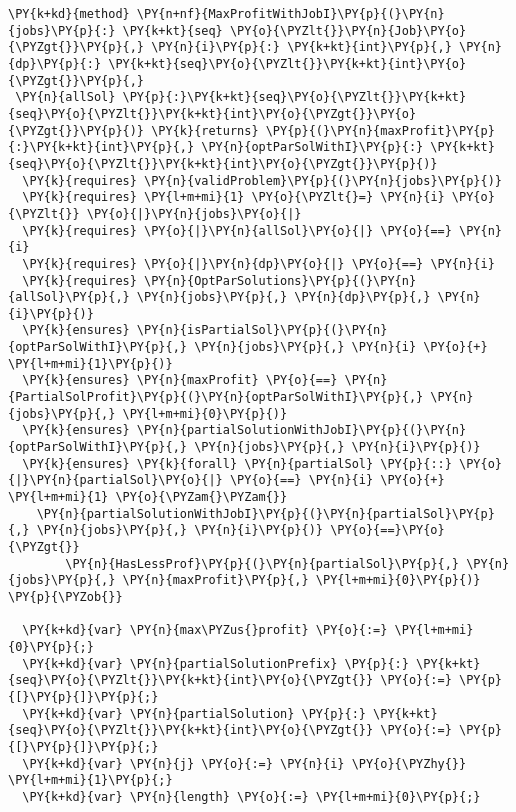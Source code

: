 \begin{Verbatim}[commandchars=\\\{\}, fontsize=\footnotesize]
\PY{k+kd}{method} \PY{n+nf}{MaxProfitWithJobI}\PY{p}{(}\PY{n}{jobs}\PY{p}{:} \PY{k+kt}{seq} \PY{o}{\PYZlt{}}\PY{n}{Job}\PY{o}{\PYZgt{}}\PY{p}{,} \PY{n}{i}\PY{p}{:} \PY{k+kt}{int}\PY{p}{,} \PY{n}{dp}\PY{p}{:} \PY{k+kt}{seq}\PY{o}{\PYZlt{}}\PY{k+kt}{int}\PY{o}{\PYZgt{}}\PY{p}{,}
 \PY{n}{allSol} \PY{p}{:}\PY{k+kt}{seq}\PY{o}{\PYZlt{}}\PY{k+kt}{seq}\PY{o}{\PYZlt{}}\PY{k+kt}{int}\PY{o}{\PYZgt{}}\PY{o}{\PYZgt{}}\PY{p}{)} \PY{k}{returns} \PY{p}{(}\PY{n}{maxProfit}\PY{p}{:}\PY{k+kt}{int}\PY{p}{,} \PY{n}{optParSolWithI}\PY{p}{:} \PY{k+kt}{seq}\PY{o}{\PYZlt{}}\PY{k+kt}{int}\PY{o}{\PYZgt{}}\PY{p}{)}
  \PY{k}{requires} \PY{n}{validProblem}\PY{p}{(}\PY{n}{jobs}\PY{p}{)}
  \PY{k}{requires} \PY{l+m+mi}{1} \PY{o}{\PYZlt{}=} \PY{n}{i} \PY{o}{\PYZlt{}} \PY{o}{|}\PY{n}{jobs}\PY{o}{|}
  \PY{k}{requires} \PY{o}{|}\PY{n}{allSol}\PY{o}{|} \PY{o}{==} \PY{n}{i}
  \PY{k}{requires} \PY{o}{|}\PY{n}{dp}\PY{o}{|} \PY{o}{==} \PY{n}{i}
  \PY{k}{requires} \PY{n}{OptParSolutions}\PY{p}{(}\PY{n}{allSol}\PY{p}{,} \PY{n}{jobs}\PY{p}{,} \PY{n}{dp}\PY{p}{,} \PY{n}{i}\PY{p}{)}
  \PY{k}{ensures} \PY{n}{isPartialSol}\PY{p}{(}\PY{n}{optParSolWithI}\PY{p}{,} \PY{n}{jobs}\PY{p}{,} \PY{n}{i} \PY{o}{+} \PY{l+m+mi}{1}\PY{p}{)}
  \PY{k}{ensures} \PY{n}{maxProfit} \PY{o}{==} \PY{n}{PartialSolProfit}\PY{p}{(}\PY{n}{optParSolWithI}\PY{p}{,} \PY{n}{jobs}\PY{p}{,} \PY{l+m+mi}{0}\PY{p}{)}
  \PY{k}{ensures} \PY{n}{partialSolutionWithJobI}\PY{p}{(}\PY{n}{optParSolWithI}\PY{p}{,} \PY{n}{jobs}\PY{p}{,} \PY{n}{i}\PY{p}{)}
  \PY{k}{ensures} \PY{k}{forall} \PY{n}{partialSol} \PY{p}{::} \PY{o}{|}\PY{n}{partialSol}\PY{o}{|} \PY{o}{==} \PY{n}{i} \PY{o}{+} \PY{l+m+mi}{1} \PY{o}{\PYZam{}\PYZam{}} 
    \PY{n}{partialSolutionWithJobI}\PY{p}{(}\PY{n}{partialSol}\PY{p}{,} \PY{n}{jobs}\PY{p}{,} \PY{n}{i}\PY{p}{)} \PY{o}{==}\PY{o}{\PYZgt{}}
        \PY{n}{HasLessProf}\PY{p}{(}\PY{n}{partialSol}\PY{p}{,} \PY{n}{jobs}\PY{p}{,} \PY{n}{maxProfit}\PY{p}{,} \PY{l+m+mi}{0}\PY{p}{)}
\PY{p}{\PYZob{}}

  \PY{k+kd}{var} \PY{n}{max\PYZus{}profit} \PY{o}{:=} \PY{l+m+mi}{0}\PY{p}{;}
  \PY{k+kd}{var} \PY{n}{partialSolutionPrefix} \PY{p}{:} \PY{k+kt}{seq}\PY{o}{\PYZlt{}}\PY{k+kt}{int}\PY{o}{\PYZgt{}} \PY{o}{:=} \PY{p}{[}\PY{p}{]}\PY{p}{;}
  \PY{k+kd}{var} \PY{n}{partialSolution} \PY{p}{:} \PY{k+kt}{seq}\PY{o}{\PYZlt{}}\PY{k+kt}{int}\PY{o}{\PYZgt{}} \PY{o}{:=} \PY{p}{[}\PY{p}{]}\PY{p}{;}
  \PY{k+kd}{var} \PY{n}{j} \PY{o}{:=} \PY{n}{i} \PY{o}{\PYZhy{}} \PY{l+m+mi}{1}\PY{p}{;}
  \PY{k+kd}{var} \PY{n}{length} \PY{o}{:=} \PY{l+m+mi}{0}\PY{p}{;}


\end{Verbatim}
